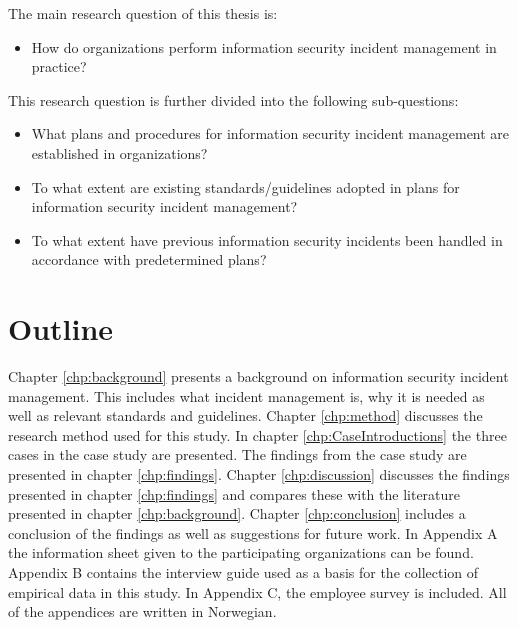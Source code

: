 The main research question of this thesis is:
\begin{itemize}
\item How do organizations perform information security incident management in practice?
\end{itemize}

This research question is further divided into the following sub-questions:

\begin{itemize}\itemsep-0.1cm
\item What plans and procedures for information security incident management are established in organizations?
\item To what extent are existing standards/guidelines adopted in plans for information security incident management?
\item To what extent have previous information security incidents been handled in accordance with predetermined plans? 
\end{itemize}

\section{Outline}
Chapter \ref{chp:background} presents a background on information security incident management. This includes what incident management is, why it is needed as well as relevant standards and guidelines. Chapter \ref{chp:method} discusses the research method used for this study. In chapter \ref{chp:CaseIntroductions} the three cases in the case study are presented. The findings from the case study are presented in chapter \ref{chp:findings}. Chapter \ref{chp:discussion} discusses the findings presented in chapter \ref{chp:findings} and compares these with the literature presented in chapter \ref{chp:background}. Chapter \ref{chp:conclusion} includes a conclusion of the findings as well as suggestions for future work. In Appendix A the information sheet given to the participating organizations can be found. Appendix B contains the interview guide used as a basis for the collection of empirical data in this study. In Appendix C, the employee survey is included. All of the appendices are written in Norwegian.